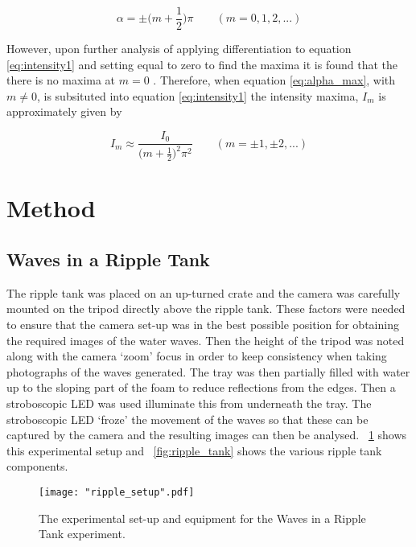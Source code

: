 \documentclass{article}
\newcommand{\figref}[2][\figurename~]{#1\ref{#2}}
\begin{document}
\begin{equation}
\label{eq:alpha_max}
\alpha = \pm\bigg(m + \frac{1}{2}\bigg)\pi \quad\quad(m = 0, 1, 2, ...)
\end{equation}

\vspace{2mm}
\noindent
However, upon further analysis of applying differentiation to equation \eqref{eq:intensity1} and setting equal to zero to find the maxima it is found that the there is no maxima at $m = 0$ \cite{Book01}. Therefore, when equation \eqref{eq:alpha_max}, with $m \neq 0$, is subsituted into equation \eqref{eq:intensity1} the intensity maxima, $I_m$ is approximately given by \cite{Book01}

\vspace{2mm}
\noindent
\begin{equation}
\label{eq:max_intensity}
I_m \approx \frac{I_0}{\big(m + \frac{1}{2}\big)^2\pi^2} \quad\quad(m =  \pm1, \pm2, ...)
\end{equation}


\section{Method}
\label{sec:method}

\subsection{Waves in a Ripple Tank}
\label{ssec:ripple-method}

\vspace{2mm}
\noindent
The ripple tank was placed on an up-turned crate and the camera was carefully mounted on the tripod directly above the ripple tank. These factors were needed to ensure that the camera set-up was in the best possible position for obtaining the required images of the water waves. Then the height of the tripod was noted along with the camera `zoom' focus in order to keep consistency when taking photographs of the waves generated. The tray was then partially filled with water up to the sloping part of the foam \cite{Paper01} to reduce reflections from the edges. Then a stroboscopic LED was used illuminate this from underneath the tray. The stroboscopic LED `froze' the movement of the waves so that these can be captured by the camera and the resulting images can then be analysed. \figref{fig:ripple_setup} shows this experimental setup and \figref{fig:ripple_tank} shows the various ripple tank components.

\begin{figure}[h]
\centering
\texttt{[image: "ripple\_setup".pdf]}
\caption{The experimental set-up and equipment for the Waves in a Ripple Tank experiment.}
\label{fig:ripple_setup}
\end{figure}
\end{document}
